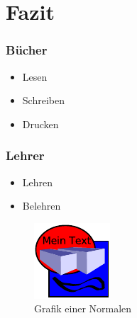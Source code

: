 \section{Fazit}

\begin{frame}
	\frametitle{Bücher}
	\begin{itemize}
		\item Lesen
		\item Schreiben
		\item Drucken
	\end{itemize}
\end{frame}

\begin{frame}
	\frametitle{Lehrer}
	\begin{itemize}
		\item Lehren
		\item Belehren
	\end{itemize}
	\begin{figure}
				\includegraphics[width=0.4\linewidth]{figures/fig}
				\caption{Grafik einer Normalen}
				\label{fig:Normale}
	\end{figure}
\end{frame}
